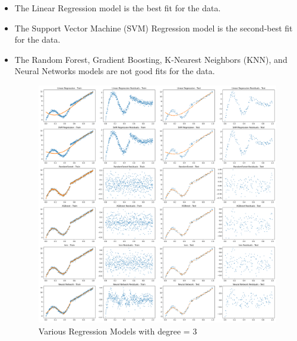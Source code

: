 \begin{itemize}
	\item The Linear Regression model is the best fit for the data.
	\item The Support Vector Machine (SVM) Regression model is the second-best fit for the data.
	\item The Random Forest, Gradient Boosting, K-Nearest Neighbors (KNN), and Neural Networks models are not good fits for the data.

\begin{figure}[H]
	\centering
	\includegraphics[width=\linewidth]{./Images/E3-MLR3-3.png}
	\caption{Various Regression Models with degree = 3}
\end{figure}


\end{itemize}
